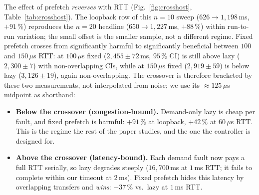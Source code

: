 \documentclass[journal]{IEEEtran}
\begin{document}
The effect of prefetch \emph{reverses} with RTT
(Fig.~\ref{fig:crosshost}, Table~\ref{tab:crosshost}). The loopback row of
this $n\!=\!10$ sweep ($626\!\to\!1{,}198$\,ms, $+91\,\%$) reproduces the
$n\!=\!20$ headline ($650\!\to\!1{,}227$\,ms, $+88\,\%$) within run-to-run
variation; the small offset is the smaller sample, not a different regime.
Fixed prefetch crosses from significantly harmful to significantly beneficial
between $100$ and $150\,\mu$s RTT: at $100\,\mu$s fixed ($2{,}455\!\pm\!72$\,ms,
$95\,\%$ CI) is still above lazy ($2{,}300\!\pm\!7$) with non-overlapping CIs,
while at $150\,\mu$s fixed ($2{,}919\!\pm\!59$) is below lazy
($3{,}126\!\pm\!19$), again non-overlapping. The crossover is therefore
bracketed by these two measurements, not interpolated from noise; we use its
${\approx}125\,\mu$s midpoint as shorthand:

\begin{itemize}
\item \textbf{Below the crossover (congestion-bound).} Demand-only lazy is
cheap per fault, and fixed prefetch is harmful: $+91\,\%$ at loopback,
$+42\,\%$ at $60\,\mu$s RTT. This is the regime the rest of the paper
studies, and the one the controller is designed for.

\item \textbf{Above the crossover (latency-bound).} Each demand fault now
pays a full RTT serially, so lazy degrades steeply ($16{,}700$\,ms at
$1$\,ms RTT; it fails to complete within our timeout at $2$\,ms). Fixed
prefetch hides this latency by overlapping transfers and \emph{wins}:
$-37\,\%$ vs.\ lazy at $1$\,ms RTT.
\end{itemize}
\end{document}
